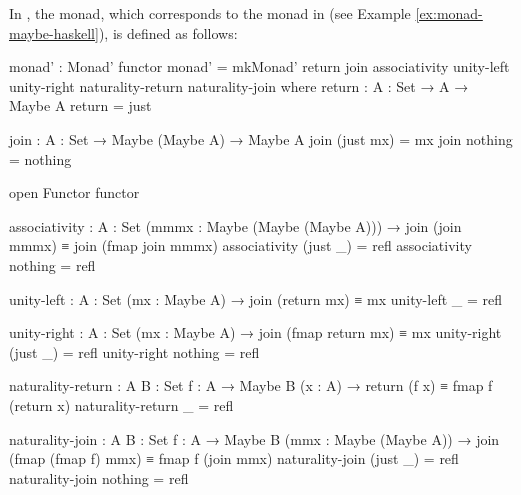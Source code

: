 \begin{example}
  \label{ex:monad-maybe-agda}

  In \agda, the  monad, which corresponds to the
   monad in \hask (see Example
  \ref{ex:monad-maybe-haskell}), is defined as follows:
  \begin{codeagda}
monad' : Monad' functor
monad' = mkMonad' return join associativity unity-left unity-right
                  naturality-return naturality-join
  where
    return : {A : Set} → A → Maybe A
    return = just

    join : {A : Set} → Maybe (Maybe A) → Maybe A
    join (just mx) = mx
    join nothing   = nothing

    open Functor functor

    associativity : {A : Set} (mmmx : Maybe (Maybe (Maybe A))) →
                    join (join mmmx) ≡ join (fmap join mmmx)
    associativity (just _) = refl
    associativity nothing  = refl

    unity-left : {A : Set} (mx : Maybe A) → join (return mx) ≡ mx
    unity-left _ = refl

    unity-right : {A : Set} (mx : Maybe A) → join (fmap return mx) ≡ mx
    unity-right (just _) = refl
    unity-right nothing  = refl

    naturality-return : {A B : Set} {f : A → Maybe B} (x : A) →
                        return (f x) ≡ fmap f (return x)
    naturality-return _ = refl

    naturality-join : {A B : Set} {f : A → Maybe B} (mmx : Maybe (Maybe A)) →
                      join (fmap (fmap f) mmx) ≡ fmap f (join mmx)
    naturality-join (just _) = refl
    naturality-join nothing  = refl
  \end{codeagda}

\end{example}

